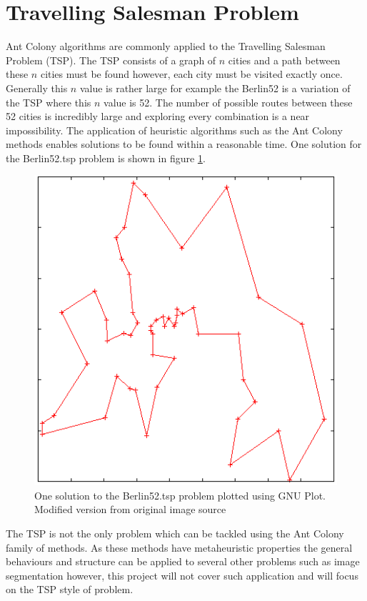 \section{Travelling Salesman Problem}
\label{tsp}
Ant Colony algorithms are commonly applied to the Travelling Salesman Problem (TSP). The TSP consists of a graph of $n$ cities and a path between these $n$ cities must be found however, each city must be visited exactly once. Generally this $n$ value is rather large for example the Berlin52\cite{berlin52:source} is a variation of the TSP where this $n$ value is 52. The number of possible routes between these 52 cities is incredibly large and exploring every combination is a near impossibility. The application of heuristic algorithms such as the Ant Colony methods enables solutions to be found within a reasonable time. One solution for the Berlin52.tsp problem is shown in figure \ref{fig:berlin52}.

\begin{figure}[h!]
\centering
\includegraphics[scale=0.7]{Images/chapter1/tsp52}
\caption[Example Berlin52.tsp Solution]{One solution to the Berlin52.tsp problem plotted using GNU Plot. Modified version from original image source \cite{berlin52:image}}
\label{fig:berlin52}
\end{figure}

The TSP is not the only problem which can be tackled using the Ant Colony family of methods. As these methods have metaheuristic properties the general behaviours and structure can be applied to several other problems such as image segmentation however, this project will not cover such application and will focus on the TSP style of problem.

